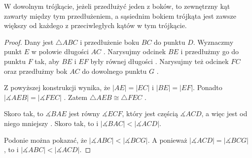 \documentclass[12pt, a4paper]{scrartcl}
\begin{document}
\begin{theorem}
    W dowolnym trójkącie, jeżeli przedłużyć jeden z boków, to zewnętrzny kąt
    zawarty między tym przedłużeniem, a sąsiednim bokiem trójkąta jest zawsze
    większy od każdego z przeciwległych kątów w tym trójkącie.

    \begin{figure}[!h]
        \begin{center}
        \end{center}
    \end{figure}

    \begin{proof}
        Dany jest \(\triangle ABC\) i przedłużenie boku \(BC\) do punktu \(D\).
        Wyznaczmy punkt \(E\) w połowie długości \(AC\) . Narysujmy
        odcinek \(BE\)  i przedłużmy go do punktu \(F\) tak, aby \(BE\)
        i \(EF\) były równej długości . Narysujmy też odcinek \(FC\)
         oraz przedłużmy bok \(AC\) do dowolnego punktu \(G\) .

        Z powyższej konstrukcji wynika, że \(|AE| = |EC|\) i \(|BE| = |EF|\).
        Ponadto \(|\measuredangle AEB| = |\measuredangle FEC|\) .
        Zatem \(\triangle AEB \cong \triangle FEC\) .

        Skoro tak, to \(\measuredangle BAE\) jest równy \(\measuredangle ECF\),
        który jest częścią \(\measuredangle ACD\), a więc jest od niego mniejszy
        . Skoro tak, to i \(|\measuredangle BAC| <
        |\measuredangle ACD|\).

        Podonie można pokazać, że \(|\measuredangle ABC| < |\measuredangle BCG|\).
        A ponieważ \(|\measuredangle ACD| = |\measuredangle BCG|\) ,
        to i \(|\measuredangle ABC| < |\measuredangle ACD|\).
    \end{proof}
\end{theorem}
\end{document}
